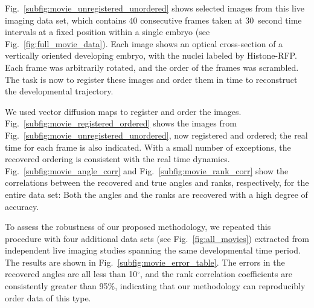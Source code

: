 \documentclass{pnastwo}
\newcommand{\fig}[0]{Fig.}
\begin{document}
\begin{article}
\fig~\ref{subfig:movie_unregistered_unordered} shows selected images from this live imaging data set, which contains $40$ consecutive frames taken at $30$~second time intervals at a fixed position within a single embryo (see \fig~\ref{fig:full_movie_data}).
%
Each image shows an optical cross-section of a vertically oriented developing embryo, with the nuclei labeled by Histone-RFP.
%
Each frame was arbitrarily rotated, and the order of the frames was scrambled.
%
The task is now to register these images and order them in time to reconstruct the developmental trajectory.

We used vector diffusion maps to register and order the images. 
%
\fig~\ref{subfig:movie_registered_ordered} shows the images from \fig~\ref{subfig:movie_unregistered_unordered}, now registered and ordered; the real time for each frame is also indicated.
%
With a small number of exceptions, the recovered ordering is consistent with the real time dynamics. 
%
\fig~\ref{subfig:movie_angle_corr} and \fig~\ref{subfig:movie_rank_corr}  show the correlations between the recovered and true angles and ranks, respectively, for the entire data set: 
%
Both the angles and the ranks are recovered with a high degree of accuracy.

To assess the robustness of our proposed methodology, we repeated this procedure with four additional data sets (see \fig~\ref{fig:all_movies}) extracted from independent live imaging studies spanning the same developmental time period. 
%
The results are shown in \fig~\ref{subfig:movie_error_table}. 
%
The errors in the recovered angles are all less than 10$^\circ$, and the rank correlation coefficients are consistently greater than 95\%, indicating that our methodology can reproducibly order data of this type. 


\end{article}
\end{document}
